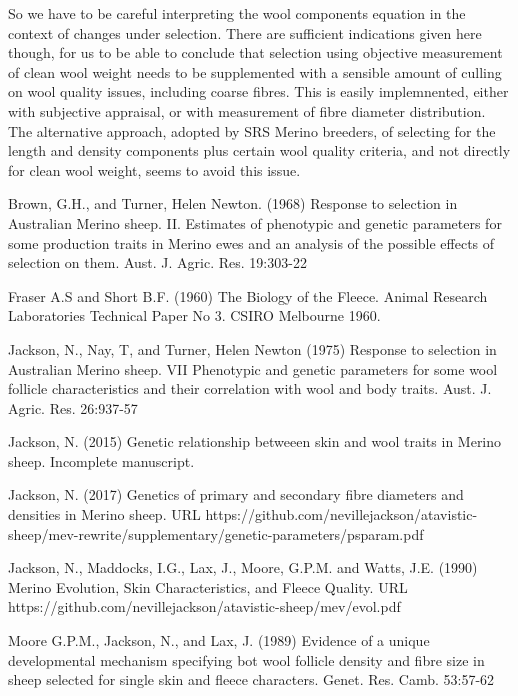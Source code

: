 \documentclass[titlepage]{article}  %
\begin{document}
So we have to be careful interpreting the wool components equation in the context of changes under selection.  There are sufficient indications given here though, for us to be able to conclude that selection using objective measurement of clean wool weight needs to be supplemented with a sensible amount of culling on wool quality issues, including coarse fibres. This is easily implemnented, either with subjective appraisal, or with measurement of fibre diameter distribution. The alternative approach, adopted by SRS Merino breeders, of selecting for the length and density components plus certain wool quality criteria, and not directly for clean wool weight, seems to avoid this issue.


\clearpage
\begin{thebibliography}{99}

Brown, G.H., and Turner, Helen Newton. (1968) Response to selection in Australian Merino sheep. II. Estimates of phenotypic and genetic parameters for some production traits in Merino ewes and an analysis of the possible effects of selection on them. Aust. J. Agric. Res. 19:303-22


Fraser A.S and Short B.F. (1960) The Biology of the Fleece. Animal Research Laboratories Technical Paper No 3. CSIRO Melbourne 1960.

Jackson, N., Nay, T, and Turner, Helen Newton (1975) Response to selection in Australian Merino sheep. VII Phenotypic and genetic parameters for some wool follicle characteristics and their correlation with wool and body traits. Aust. J. Agric. Res. 26:937-57

Jackson, N. (2015) Genetic relationship betweeen skin and wool traits in Merino sheep. Incomplete manuscript.


Jackson, N. (2017) Genetics of primary and secondary fibre diameters and densities in Merino sheep. URL https://github.com/nevillejackson/atavistic-sheep/mev-rewrite/supplementary/genetic-parameters/psparam.pdf

Jackson, N., Maddocks, I.G., Lax, J., Moore, G.P.M. and Watts, J.E. (1990) Merino Evolution, Skin Characteristics, and Fleece Quality. URL https://github.com/nevillejackson/atavistic-sheep/mev/evol.pdf 

Moore G.P.M., Jackson, N., and Lax, J. (1989) Evidence of a unique developmental mechanism specifying bot wool follicle density and fibre size in sheep selected for single skin and fleece characters. Genet. Res. Camb. 53:57-62


\end{thebibliography}
\end{document}
